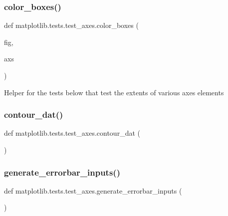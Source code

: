 \subsubsection{\texorpdfstring{color\+\_\+boxes()}{color\_boxes()}}
{\footnotesize\ttfamily def matplotlib.\+tests.\+test\+\_\+axes.\+color\+\_\+boxes (\begin{DoxyParamCaption}\item[{}]{fig,  }\item[{}]{axs }\end{DoxyParamCaption})}

\begin{DoxyVerb}Helper for the tests below that test the extents of various axes elements
\end{DoxyVerb}
 \mbox{\label{namespacematplotlib_1_1tests_1_1test__axes_a81737cb95742ecd5b58496ffb06f8951}} 
\subsubsection{\texorpdfstring{contour\+\_\+dat()}{contour\_dat()}}
{\footnotesize\ttfamily def matplotlib.\+tests.\+test\+\_\+axes.\+contour\+\_\+dat (\begin{DoxyParamCaption}{ }\end{DoxyParamCaption})}

\mbox{\label{namespacematplotlib_1_1tests_1_1test__axes_a4927ce60fb78019e8cb3df62aca7eabf}} 
\subsubsection{\texorpdfstring{generate\+\_\+errorbar\+\_\+inputs()}{generate\_errorbar\_inputs()}}
{\footnotesize\ttfamily def matplotlib.\+tests.\+test\+\_\+axes.\+generate\+\_\+errorbar\+\_\+inputs (\begin{DoxyParamCaption}{ }\end{DoxyParamCaption})}


